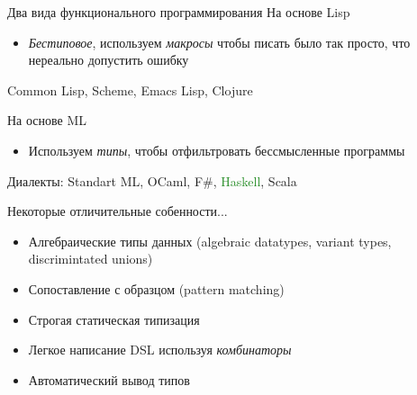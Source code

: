 \documentclass{beamer}
\begin{document}
\begin{frame}{Два вида функционального программирования}
На основе Lisp
\begin{itemize}
 \item \emph{Бестиповое}, используем \emph{макросы} чтобы писать было так просто, что нереально допустить ошибку
\end{itemize}
\vspace{0.5cm}
Common Lisp, Scheme, Emacs Lisp, Clojure

\vspace{1cm}\pause
На основе ML
\begin{itemize}
 \item Используем \emph{типы}, чтобы отфильтровать бессмысленные программы
\end{itemize}
\vspace{0.5cm}
Диалекты: Standart ML, OCaml, F\#, \textcolor{ForestGreen}{Haskell}, Scala
\end{frame}

\begin{frame}{Некоторые отличительные собенности...}
\begin{itemize}
 \item Алгебраические типы данных (algebraic datatypes, variant types, discrimintated unions)
 \item Сопоставление с образцом (pattern matching)
 \item Строгая статическая типизация
 \item Легкое  написание DSL используя \emph{комбинаторы}
 \item Автоматический вывод типов
\end{itemize}
\end{frame}
\end{document}
